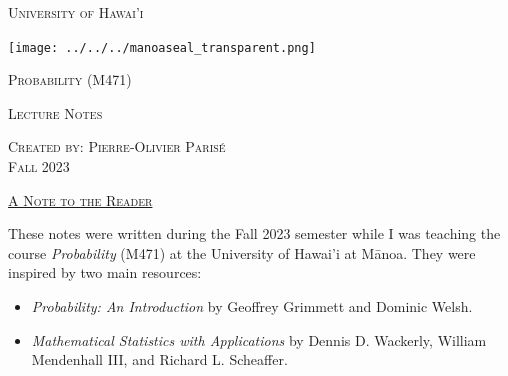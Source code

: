 

\renewcommand{\contentsname}{Blablabla}



\vspace*{4cm}

\noindent\hrulefill
\begin{center}
\begin{center}
\begin{minipage}{0.6\textwidth}
\begin{Huge}
\textsc{University of Hawai'i}
\end{Huge}
\end{minipage}
\begin{minipage}{0.12\textwidth}
\texttt{[image: ../../../manoaseal\_transparent.png]}
\end{minipage}
\end{center}
\noindent\hrulefill

\vspace*{2cm}

{\Huge \textsc{Probability (M471)}} 

\vspace*{2cm}

\vspace*{0.5cm}

{\Large \textsc{Lecture Notes}}

\vspace*{2cm}

\noindent \textsc{Created by: Pierre-Olivier Paris{\'e}} \\
\textsc{Fall 2023}
\end{center}

\thispagestyle{empty}

\newpage 

\phantom{This page was intentionally left blank}

\thispagestyle{empty}

\newpage 

\begin{center}
\Huge{\ul{\textsc{A Note to the Reader}}}
\end{center}

\vspace*{1cm}

These notes were written during the Fall 2023 semester while I was teaching the course \textit{Probability} (M471) at the University of Hawai'i at Mānoa. They were inspired by two main resources:
\begin{itemize}
\item \textit{Probability: An Introduction} by Geoffrey Grimmett and Dominic Welsh.
\item \textit{Mathematical Statistics with Applications} by Dennis D. Wackerly, William Mendenhall III, and Richard L. Scheaffer.
\end{itemize}

